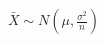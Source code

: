 \documentclass[preview]{standalone}
\begin{document}
\begin{align*}
\bar{X} \sim N\left(\mu, \frac{\sigma^2}{n}\right)
\end{align*}
\end{document}
